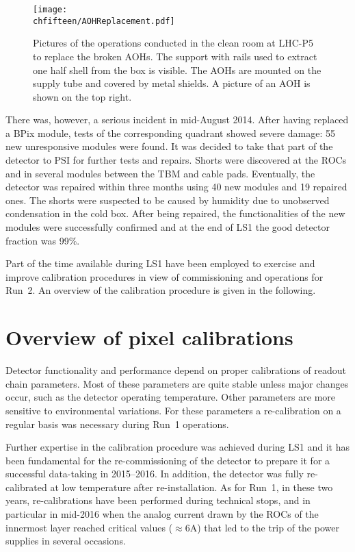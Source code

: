 \begin{figure}[!htb]
 \begin{center}
 \texttt{[image: \\chfifteen/AOHReplacement.pdf]}
 \end{center}
 \caption{Pictures of the operations conducted in the clean room at LHC-P5 to replace the broken AOHs. The support with rails used to extract one half shell from the box is visible.
 The AOHs are mounted on the supply tube and covered by metal shields. A picture of an AOH is shown on the top right.}
 \label{fig:AOHreplace}
\end{figure}

There was, however, a serious incident in mid-August 2014. After having replaced a BPix module, tests of the corresponding quadrant showed severe damage: 55 new unresponsive modules were found.
It was decided to take that part of the detector to PSI for further tests and repairs. Shorts were discovered at the ROCs and in several modules between the TBM and cable pads. Eventually, the detector was repaired within three months using 40 new modules and 19 repaired ones. The shorts were suspected to be caused by humidity due to unobserved condensation in the cold box. 
After being repaired, the functionalities of the new modules were successfully confirmed and at the end of LS1 the good detector fraction was 99\%.

Part of the time available during LS1 have been employed to exercise and improve calibration procedures in view of commissioning and operations for Run~2.
An overview of the calibration procedure is given in the following.

\section{Overview of pixel calibrations}

Detector functionality and performance depend on proper calibrations of readout chain parameters.
Most of these parameters are quite stable unless major changes occur, such as the detector operating temperature.
Other parameters are more sensitive to environmental variations.
For these parameters a re-calibration on a regular basis was necessary during Run~1 operations.

Further expertise in the calibration procedure was achieved during LS1 and it has been fundamental 
for the re-commissioning of the detector to prepare it for a successful data-taking in 2015--2016.
In addition, the detector was fully re-calibrated at low temperature after re-installation.
As for Run~1, in these two years, re-calibrations have been performed during technical stops, and in particular in mid-2016 when the analog current drawn by the ROCs of the innermost layer reached critical values ($\approx6$\unit{A}) that led to the trip of the power supplies in several occasions.

